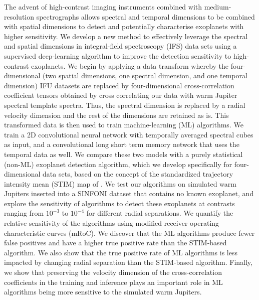 \documentclass{aa}
\begin{document}
  \abstract
  {The advent of high-contrast imaging instruments combined with medium-resolution spectrographs allows spectral and temporal dimensions to be combined with spatial dimensions to detect and potentially characterise exoplanets with higher sensitivity.}
  {We develop a new method to effectively leverage the spectral and spatial dimensions in integral-field spectroscopy (IFS) data sets using a supervised deep-learning algorithm to improve the detection sensitivity to high-contrast exoplanets.}
  {
  We begin by applying a data transform whereby the four-dimensional (two spatial dimensions, one spectral dimension, and one temporal dimension) IFU datasets are replaced by four-dimensional cross-correlation coefficient tensors obtained by cross correlating our data with warm Jupiter spectral template spectra.
  Thus, the spectral dimension is replaced by a radial velocity dimension and the rest of the dimensions are retained as is.
  This transformed data is then used to train machine-learning (ML) algorithms.
  We train a 2D convolutional neural network 
  with temporally averaged spectral cubes as input, and a convolutional long short term memory network that uses the temporal data as well.
  We compare these two models with a purely statistical (non-ML) exoplanet detection algorithm, which we develop specifically for four-dimensional data sets, based on the concept of the standardized trajectory intensity mean (STIM) map of \citet{2019Pairet}.
  We test our algorithms on simulated warm Jupiters inserted into a SINFONI dataset that contains no known exoplanet, and explore the sensitivity of algorithms to detect these exoplanets at contrasts ranging from $10^{-3}$ to $10^{-4}$ for different radial separations.
  }
  {%
  We quantify the relative sensitivity of the algorithms using modified receiver operating characteristic curves (mRoC).
  We discover that the ML algorithms produce fewer false positives and have a higher true positive rate than the STIM-based algorithm.
  We also show that the true positive rate of ML algorithms is less impacted by changing radial separation than the STIM-based algorithm.
  Finally, we show that preserving the velocity dimension of the cross-correlation coefficients in the training and inference plays an important role in ML algorithms being more sensitive to the simulated warm Jupiters.}
\end{document}
